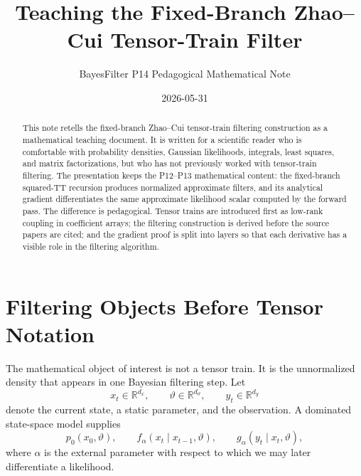 \documentclass[11pt]{article}
\title{Teaching the Fixed-Branch Zhao--Cui Tensor-Train Filter}
\author{BayesFilter P14 Pedagogical Mathematical Note}
\date{2026-05-31}
\newcommand{\R}{\mathbb{R}}
\renewcommand{\[}{\begin{equation}}
\renewcommand{\]}{\end{equation}}
\theoremstyle{definition}
\theoremstyle{remark}
\begin{document}
\maketitle

\begin{abstract}
This note retells the fixed-branch Zhao--Cui tensor-train filtering
construction as a mathematical teaching document.  It is written for a
scientific reader who is comfortable with probability densities, Gaussian
likelihoods, integrals, least squares, and matrix factorizations, but who has
not previously worked with tensor-train filtering.  The presentation keeps the
P12--P13 mathematical content: the fixed-branch squared-TT recursion produces
normalized approximate filters, and its analytical gradient differentiates the
same approximate likelihood scalar computed by the forward pass.  The
difference is pedagogical.  Tensor trains are introduced first as low-rank
coupling in coefficient arrays; the filtering construction is derived before
the source papers are cited; and the gradient proof is split into layers so
that each derivative has a visible role in the filtering algorithm.
\end{abstract}

\section{Filtering Objects Before Tensor Notation}

The mathematical object of interest is not a tensor train.  It is the
unnormalized density that appears in one Bayesian filtering step.  Let
\[
  x_t\in\R^{d_x},\qquad \vartheta\in\R^{d_\vartheta},\qquad y_t\in\R^{d_y}
\]
denote the current state, a static parameter, and the observation.  A dominated
state-space model supplies
\[
  p_0(x_0,\vartheta),\qquad
  f_\alpha(x_t\mid x_{t-1},\vartheta),\qquad
  g_\alpha(y_t\mid x_t,\vartheta),
  \label{eq:p14-ssm}
\]
where \(\alpha\) is the external parameter with respect to which we may later
differentiate a likelihood.
\end{document}
